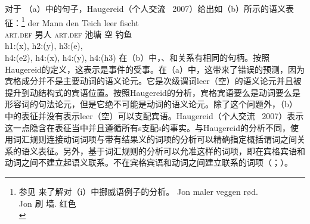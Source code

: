 \begin{exe}
\begin{xlist}[iv.]
\begin{exe}
\begin{xlist}[iv.]
对于 （a）中的句子，Haugereid（个人交流 \, 2007）给出如（b）所示的语义表征：\footnote{%
  参见 来了解对（i）中挪威语例子的分析。
\ea
\gll Jon maler veggen rød.\\
     Jon 刷 墙. 红色\\
\zlast
}
\eal
\ex 
\gll der Mann den Teich leer fischt\\
	 \textsc{art}.\textsc{def} 男人 \textsc{art}.\textsc{def} 池塘 空 钓鱼\\
\ex h1:(x), h2:(y), h3:(e),\\
    h4:(e2), h4:(x), h4:(y), h4:(h3)
\zl
在（b）中，、和关系有相同的句柄。按照Haugereid的定义，这表示是事件的受事。在（a）中，这带来了错误的预测，因为宾格成分并不是主要动词的语义论元。它是次级谓词leer（空）的语义论元并且被提升到动结构式的宾语位置。按照Haugereid的分析，宾格宾语要么是动词要么是形容词的句法论元，但是它绝不可能是动词的语义论元。除了这个问题外，（b）中的表征并没有表示leer（空）可以支配宾语。Haugereid（个人交流 \, 2007）表示这一点隐含在表征当中并且遵循所有s支配s的事实。与Haugereid的分析不同，使用词汇规则连接动词词项与带有结果义的词项的分析可以精确指定概括谓词之间关系的语义表征。另外，基于词汇规则的分析可以允准这样的词项，即在宾格宾语和动词之间不建立起语义联系。不在宾格宾语和动词之间建立联系的词项（\citealp{Wechsler97a,WN2001a}；\citealp[\S~5]{Mueller2002b}）。

\end{xlist}
\end{exe}
\end{xlist}
\end{exe}

